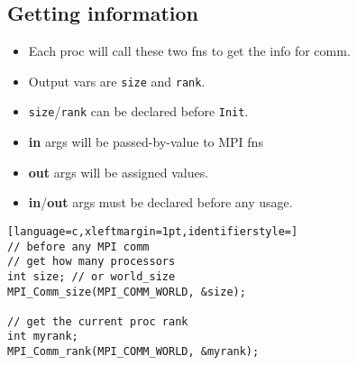 \subsection*{Getting information}
\begin{minipage}{0.5\linewidth}
  \flushleft
  \begin{itemize}
  \item Each proc will call these two fns to get the info for comm.
  \item Output vars are \texttt{size} and \texttt{rank}.
  \item \texttt{size}/\texttt{rank} can be declared before \texttt{Init}.
  \item \textbf{in} args will be passed-by-value to MPI fns
  \item \textbf{out} args will be assigned values.
  \item \textbf{in}/\textbf{out} args must be declared before any usage.
  \end{itemize}
\end{minipage}
\begin{minipage}{0.48\linewidth}
  \centering
\begin{lstlisting}[language=c,xleftmargin=1pt,identifierstyle=]
// before any MPI comm
// get how many processors
int size; // or world_size
MPI_Comm_size(MPI_COMM_WORLD, &size);

// get the current proc rank
int myrank;
MPI_Comm_rank(MPI_COMM_WORLD, &myrank);
\end{lstlisting}
\end{minipage}

